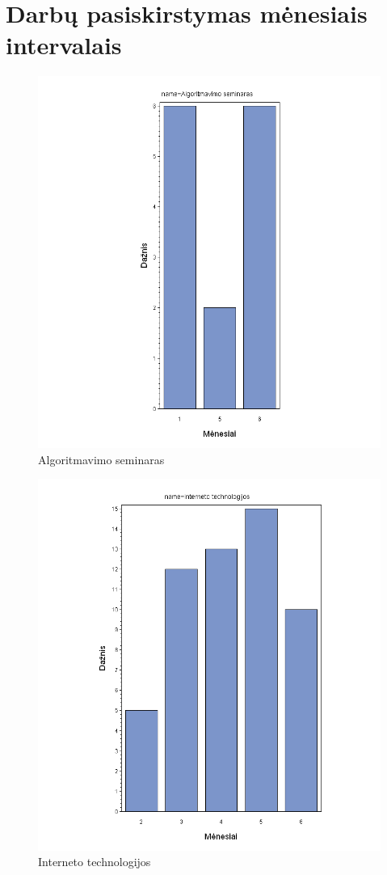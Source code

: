 
\section{Darbų pasiskirstymas mėnesiais intervalais}

\begin{figure}[htb]
\includegraphics[width=0.9\linewidth]{images/months/Algoritmavimo_seminaras.png}
\caption{Algoritmavimo seminaras}
\label{fig:algoritm}
\end{figure} 

\begin{figure}[htb]
\includegraphics[width=0.9\linewidth]{images/months/Interneto_technologijos.png}
\caption{Interneto technologijos}
\label{fig:it}
\end{figure}


